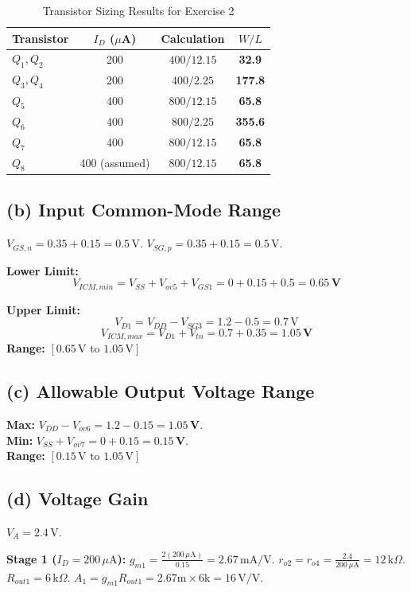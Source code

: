 \documentclass[11pt, a4paper]{article}
\newcommand{\uA}{\,\mu\text{A}}
\newcommand{\mA}{\,\text{mA}}
\newcommand{\kohm}{\,\text{k}\Omega}
\begin{document}
\begin{table}[H]
\centering
\caption{Transistor Sizing Results for Exercise 2}
\begin{tabular}{lccc}
\toprule
\textbf{Transistor} & \textbf{$I_D$ ($\mu$A)} & \textbf{Calculation} & \textbf{$W/L$} \\
\midrule
$Q_1, Q_2$ & 200 & $400 / 12.15$ & \textbf{32.9} \\
$Q_3, Q_4$ & 200 & $400 / 2.25$ & \textbf{177.8} \\
$Q_5$ & 400 & $800 / 12.15$ & \textbf{65.8} \\
$Q_6$ & 400 & $800 / 2.25$ & \textbf{355.6} \\
$Q_7$ & 400 & $800 / 12.15$ & \textbf{65.8} \\
$Q_8$ & 400 (assumed) & $800 / 12.15$ & \textbf{65.8} \\
\bottomrule
\end{tabular}
\end{table}

\subsection*{(b) Input Common-Mode Range}
$V_{GS,n} = 0.35 + 0.15 = 0.5\,\text{V}$. $V_{SG,p} = 0.35 + 0.15 = 0.5\,\text{V}$.

\textbf{Lower Limit:}
\[ V_{ICM,min} = V_{SS} + V_{ov5} + V_{GS1} = 0 + 0.15 + 0.5 = \mathbf{0.65\,\text{V}} \]

\textbf{Upper Limit:}
\[ V_{D1} = V_{DD} - V_{SG3} = 1.2 - 0.5 = 0.7\,\text{V} \]
\[ V_{ICM,max} = V_{D1} + V_{tn} = 0.7 + 0.35 = \mathbf{1.05\,\text{V}} \]
\textbf{Range:} $[0.65\,\text{V} \text{ to } 1.05\,\text{V}]$

\subsection*{(c) Allowable Output Voltage Range}
\textbf{Max:} $V_{DD} - V_{ov6} = 1.2 - 0.15 = \mathbf{1.05\,\text{V}}$.\\
\textbf{Min:} $V_{SS} + V_{ov7} = 0 + 0.15 = \mathbf{0.15\,\text{V}}$.\\
\textbf{Range:} $[0.15\,\text{V} \text{ to } 1.05\,\text{V}]$

\subsection*{(d) Voltage Gain}
$V_A = 2.4\,\text{V}$.

\textbf{Stage 1 ($I_D=200 \uA$):}
$g_{m1} = \frac{2(200 \uA)}{0.15} = 2.67 \mA/\text{V}$.
$r_{o2} = r_{o4} = \frac{2.4}{200 \uA} = 12 \kohm$.
$R_{out1} = 6 \kohm$.
$A_1 = g_{m1} R_{out1} = 2.67\text{m} \times 6\text{k} = 16\,\text{V/V}$.
\end{document}
